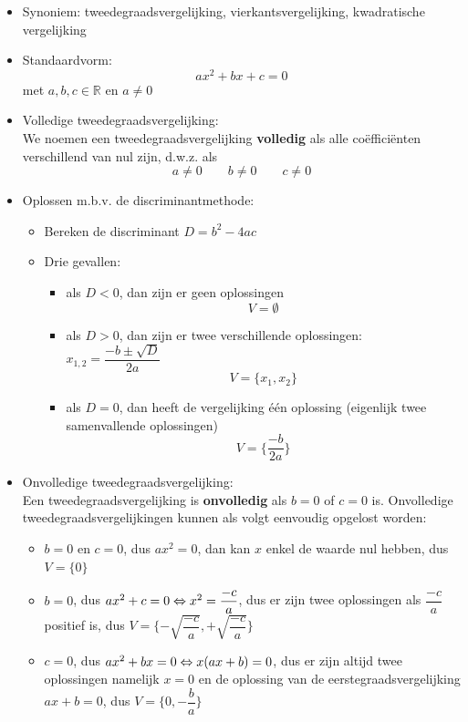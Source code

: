 \documentclass[12pt,twoside,a4paper]{article}
\begin{document}
\begin{itemize}
\item Synoniem: tweedegraadsvergelijking, vierkantsvergelijking, kwadratische vergelijking
\item Standaardvorm:
  $$ax^2 + bx + c = 0$$
  met $a, b, c \in \mathbb{R}$ en $a\neq 0$
\item Volledige tweedegraadsvergelijking:\\
  We noemen een tweedegraadsvergelijking {\bf volledig} als alle coëfficiënten verschillend van nul zijn, d.w.z. als
  $$ a\neq 0 \qquad b\neq 0 \qquad c\neq 0$$
\item Oplossen m.b.v. de discriminantmethode:
  \begin{itemize}
  \item Bereken de discriminant $D=b^2-4ac$
  \item Drie gevallen:
    \begin{itemize}
    \item als $D<0$, dan zijn er geen oplossingen
      $$V=\emptyset$$
    \item als $D>0$, dan zijn er twee verschillende oplossingen: $x_{1,2}=\dfrac{-b\pm\sqrt{D}}{2a}$
      $$V=\{x_1, x_2\}$$
    \item als $D=0$, dan heeft de vergelijking één oplossing (eigenlijk twee samenvallende oplossingen)
      $$V=\{\dfrac{-b}{2a}\}$$
    \end{itemize}
  \end{itemize}
\item Onvolledige tweedegraadsvergelijking:\\
  Een tweedegraadsvergelijking is {\bf onvolledig} als $b=0$ of $c=0$ is. Onvolledige tweedegraadsvergelijkingen kunnen als volgt eenvoudig opgelost worden:
  \begin{itemize}
    \item $b=0$ en $c=0$, dus $ax^2=0$, dan kan $x$ enkel de waarde nul hebben, dus $V=\{0\}$
    \item $b=0$, dus $ax^2+c=0 \Leftrightarrow x^2=\dfrac{-c}{a}$, dus er zijn twee oplossingen als $\dfrac{-c}{a}$ positief is, dus $V=\{-\sqrt{\dfrac{-c}{a}}, +\sqrt{\dfrac{-c}{a}}\}$
    \item $c=0$, dus $ax^2+bx=0 \Leftrightarrow x(ax+b)=0$, dus er zijn altijd twee oplossingen namelijk $x=0$ en de oplossing van de eerstegraadsvergelijking $ax+b=0$, dus $V=\{0, -\dfrac{b}{a}\}$
  \end{itemize}
\end{itemize}
\end{document}
